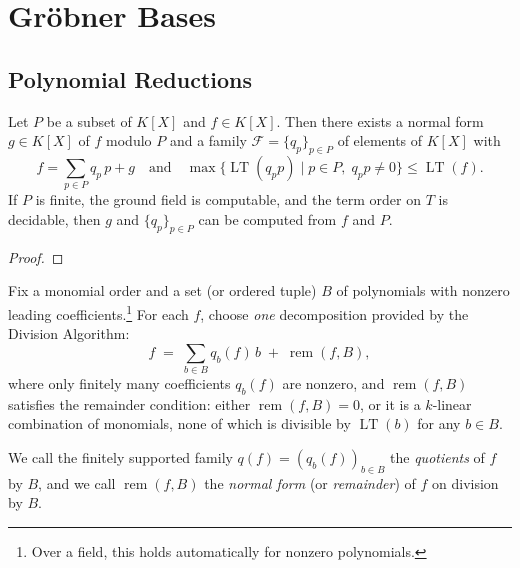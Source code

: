 \chapter{Gr{\"o}bner Bases} 

\section{Polynomial Reductions}

\begin{theorem}
\label{thm:div_alg}
  \mathlibok
  Let $P$ be a subset of $K[X]$ and $f\in K[X]$.
  Then there exists a normal form $g\in K[X]$ of $f$ modulo $P$ and a family $\mathcal{F}=\{q_{p}\}_{p\in P}$ of elements of $K[X]$ with
  \[
    f=\sum_{p\in P}q_{p}\,p + g
    \quad\text{and}\quad
    \max\bigl\{\operatorname{LT}(q_{p}p)\mid p\in P,\;q_{p}p\neq 0\bigr\}\le \operatorname{LT}(f).
  \]
  If $P$ is finite, the ground field is computable, and the term order on $T$ is decidable, 
  then $g$ and $\{q_{p}\}_{p\in P}$ can be computed from $f$ and $P$.
\end{theorem}
\begin{proof}
  \mathlibok
\end{proof}

\begin{definition}\label{def:quotients_remainder}
  \leanok
  Fix a monomial order and a set (or ordered tuple) $B$ of polynomials with nonzero leading
  coefficients.\footnote{Over a field, this holds automatically for nonzero polynomials.}
  For each $f$, choose \emph{one} decomposition provided by the Division Algorithm:
  \[
    f \;=\; \sum_{b\in B} q_b(f)\,b \;+\; \operatorname{rem}(f,B),
  \]
  where only finitely many coefficients $q_b(f)$ are nonzero, and $\operatorname{rem}(f,B)$ satisfies
  the remainder condition: either $\operatorname{rem}(f,B)=0$, or it is a $k$-linear combination of
  monomials, none of which is divisible by $\operatorname{LT}(b)$ for any $b\in B$.

  We call the finitely supported family $q(f) = (q_b(f))_{b\in B}$ the \emph{quotients} of $f$ by $B$,
  and we call $\operatorname{rem}(f,B)$ the \emph{normal form} (or \emph{remainder}) of $f$ on division by $B$.
\end{definition}

